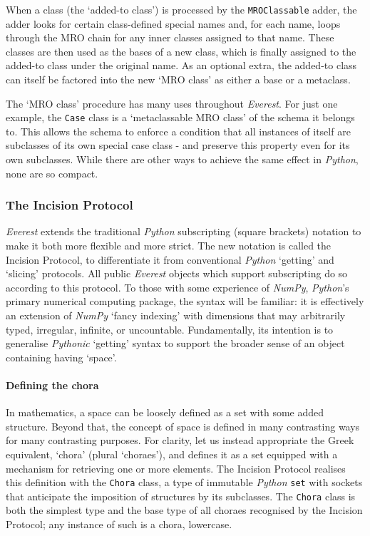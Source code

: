 \documentclass[a4paper,11pt,oneside]{book}
\begin{document}
When a class (the `added-to class') is processed by the \texttt{MROClassable} adder, the adder looks for certain class-defined special names and, for each name, loops through the MRO chain for any inner classes assigned to that name. These classes are then used as the bases of a new class, which is finally assigned to the added-to class under the original name. As an optional extra, the added-to class can itself be factored into the new `MRO class' as either a base or a metaclass.

The `MRO class' procedure has many uses throughout \textit{Everest}. For just one example, the \texttt{Case} class is a `metaclassable MRO class' of the schema it belongs to. This allows the schema to enforce a condition that all instances of itself are subclasses of its own special case class - and preserve this property even for its own subclasses. While there are other ways to achieve the same effect in \textit{Python}, none are so compact.

\subsubsection{The Incision Protocol}

\textit{Everest} extends the traditional \textit{Python} subscripting (square brackets) notation to make it both more flexible and more strict. The new notation is called the Incision Protocol, to differentiate it from conventional \textit{Python} `getting' and `slicing' protocols. All public \textit{Everest} objects which support subscripting do so according to this protocol. To those with some experience of \textit{NumPy}, \textit{Python}'s primary numerical computing package, the syntax will be familiar: it is effectively an extension of \textit{NumPy} `fancy indexing' with dimensions that may arbitrarily typed, irregular, infinite, or uncountable. Fundamentally, its intention is to generalise \textit{Pythonic} `getting' syntax to support the broader sense of an object containing having `space'.

\paragraph{Defining the chora}

In mathematics, a space can be loosely defined as a set with some added structure. Beyond that, the concept of space is defined in many contrasting ways for many contrasting purposes. For clarity, let us instead appropriate the Greek equivalent, `chora' (plural `choraes'), and defines it as a set equipped with a mechanism for retrieving one or more elements. The Incision Protocol realises this definition with the \texttt{Chora} class, a type of immutable \textit{Python} \texttt{set} with sockets that anticipate the imposition of structures by its subclasses. The \texttt{Chora} class is both the simplest type and the base type of all choraes recognised by the Incision Protocol; any instance of such is a chora, lowercase.
\end{document}
